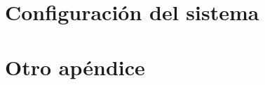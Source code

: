 \documentclass[11pt,spanish,listoffigures,listoftables]{tfgetsinf}
\begin{document}
\printbibliography 
\cleardoublepage


\APPENDIX

\chapter{Configuración del sistema}

\chapter{Otro apéndice}
\end{document}
